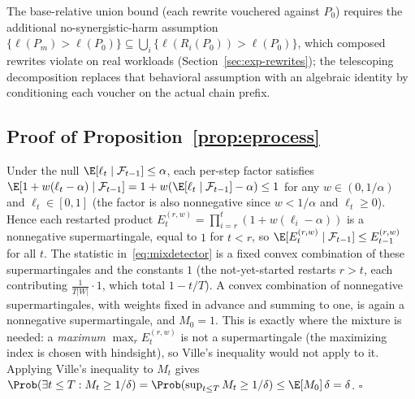 \begin{rmk}
The base-relative union bound (each rewrite vouchered against $P_0$)
requires the additional no-synergistic-harm assumption
$\{\ell(P_m) > \ell(P_0)\} \subseteq \bigcup_i \{\ell(R_i(P_0)) >
\ell(P_0)\}$, which composed rewrites violate on real workloads
(Section~\ref{sec:exp-rewrites}); the telescoping decomposition
replaces that behavioral assumption with an algebraic identity by
conditioning each voucher on the actual chain prefix.
\end{rmk}

\subsection{Proof of Proposition~\ref{prop:eprocess}}
Under the null $\E[\ell_t \mid \mathcal{F}_{t-1}] \le \alpha$, each
per-step factor satisfies
$\E[1 + w(\ell_t - \alpha) \mid \mathcal{F}_{t-1}]
= 1 + w(\E[\ell_t \mid \mathcal{F}_{t-1}] - \alpha) \le 1$
for any $w \in (0, 1/\alpha)$ and $\ell_t \in [0,1]$ (the factor is
also nonnegative since $w < 1/\alpha$ and $\ell_t \ge 0$). Hence each
restarted product
$E_t^{(r,w)} = \prod_{i=r}^{t}(1 + w(\ell_i - \alpha))$ is a
nonnegative supermartingale, equal to $1$ for $t < r$, so
$\E[E_t^{(r,w)} \mid \mathcal{F}_{t-1}] \le E_{t-1}^{(r,w)}$ for all
$t$. The statistic in~\eqref{eq:mixdetector} is a fixed convex
combination of these supermartingales and the constants $1$ (the
not-yet-started restarts $r > t$, each contributing
$\tfrac{1}{T|W|}\cdot 1$, which total $1 - t/T$). A convex combination
of nonnegative supermartingales, with weights fixed in advance and
summing to one, is again a nonnegative supermartingale, and
$M_0 = 1$. This is exactly where the mixture is needed: a
\emph{maximum} $\max_{r} E_t^{(r,w)}$ is not a supermartingale (the
maximizing index is chosen with hindsight), so Ville's inequality
would not apply to it. Applying Ville's inequality
\citep{ville1939etude} to $M_t$ gives
$\Prob(\exists t \le T : M_t \ge 1/\delta)
= \Prob(\sup_{t \le T} M_t \ge 1/\delta) \le \E[M_0]\,\delta =
\delta$. \hfill$\square$

